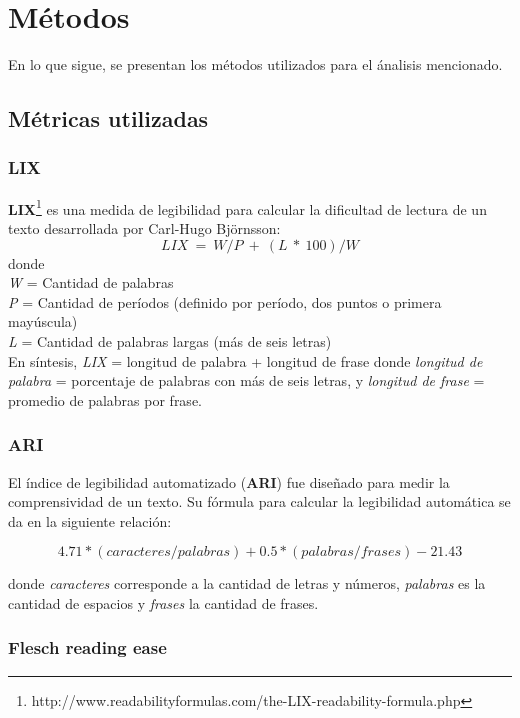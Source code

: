 \documentclass[12pt,journal,compsoc]{IEEEtran}
\begin{document}
\section{Métodos}

En lo que sigue, se presentan los métodos utilizados para el ánalisis mencionado.

\subsection{Métricas utilizadas}
\subsubsection{LIX}

\textbf{LIX}\footnote{http://www.readabilityformulas.com/the-LIX-readability-formula.php} es una medida de legibilidad para calcular la dificultad de lectura de un texto desarrollada por Carl-Hugo Björnsson:\\

$$LIX\ =\ W/P\ +\ (L\ *\ 100)/W$$
donde\\
\textit{W} = Cantidad de palabras \\
\textit{P} = Cantidad de períodos (definido por período, dos puntos o primera mayúscula)\\
\textit{L} = Cantidad de palabras largas (más de seis letras)\\

En síntesis,
\textit{LIX} = longitud de palabra + longitud de frase
donde \textit{longitud de palabra} = porcentaje de palabras con más de seis letras,
y \textit{longitud de frase} = promedio de palabras por frase.


\subsubsection{ARI}
El índice de legibilidad automatizado (\textbf{ARI}) fue diseñado para medir la comprensividad de un texto. Su fórmula para calcular la legibilidad automática se da en la siguiente relación:

$$4.71 * (caracteres/palabras)+0.5*(palabras/frases) - 21.43$$

donde \textit{caracteres} corresponde a la cantidad de letras y números, \textit{palabras} es la cantidad de espacios y \textit{frases} la cantidad de frases.

\subsubsection{Flesch reading ease}
\end{document}

